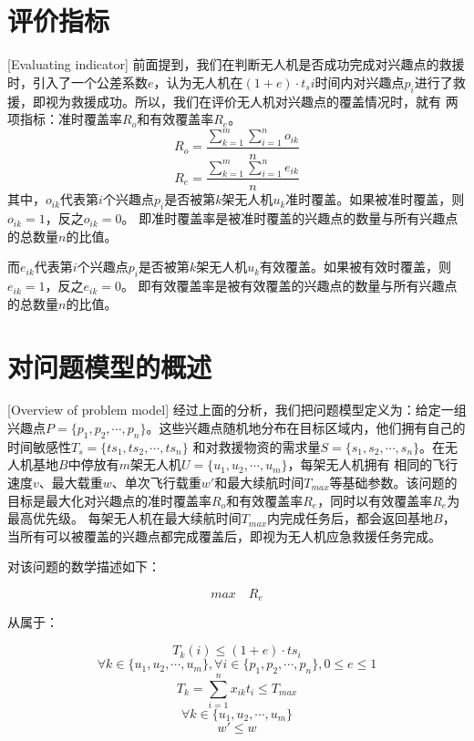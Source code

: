 \section{评价指标}[Evaluating indicator]
前面提到，我们在判断无人机是否成功完成对兴趣点的救援时，引入了一个公差系数$e$，认为无人机在$(1+e) \cdot t_si$时间内对兴趣点$p_i$进行了救援，即视为救援成功。所以，我们在评价无人机对兴趣点的覆盖情况时，就有
两项指标：准时覆盖率$R_o$和有效覆盖率$R_e$。
\begin{equation}
R_o=\frac{\sum_{k=1}^m\sum_{i=1}^n o_{ik}}{n}
\end{equation}
\begin{equation}
R_e=\frac{\sum_{k=1}^m\sum_{i=1}^n e_{ik}}{n}
\end{equation}
其中，$o_{ik}$代表第$i$个兴趣点$p_i$是否被第$k$架无人机$u_k$准时覆盖。如果被准时覆盖，则$o_{ik} = 1$，反之$o_{ik} = 0$。
即准时覆盖率是被准时覆盖的兴趣点的数量与所有兴趣点的总数量$n$的比值。


而$e_{ik}$代表第$i$个兴趣点$p_i$是否被第$k$架无人机$u_k$有效覆盖。如果被有效时覆盖，则$e_{ik} = 1$，反之$e_{ik} = 0$。
即有效覆盖率是被有效覆盖的兴趣点的数量与所有兴趣点的总数量$n$的比值。

\section{对问题模型的概述}[Overview of problem model]
经过上面的分析，我们把问题模型定义为：给定一组兴趣点$P=\lbrace p_1, p_2, \cdots ,p_n \rbrace$。这些兴趣点随机地分布在目标区域内，他们拥有自己的时间敏感性$T_s=\lbrace ts_1, ts_2, \cdots ,ts_n \rbrace$
和对救援物资的需求量$S=\lbrace s_1, s_2, \cdots ,s_n \rbrace$。在无人机基地$B$中停放有$m$架无人机$U=\lbrace u_1, u_2, \cdots ,u_m \rbrace$，每架无人机拥有
相同的飞行速度$v$、最大载重$w$、单次飞行载重$w \prime$和最大续航时间$T_{max}$等基础参数。该问题的目标是最大化对兴趣点的准时覆盖率$R_o$和有效覆盖率$R_e$，同时以有效覆盖率$R_e$为最高优先级。
每架无人机在最大续航时间$T_{max}$内完成任务后，都会返回基地$B$，当所有可以被覆盖的兴趣点都完成覆盖后，即视为无人机应急救援任务完成。


对该问题的数学描述如下：

\begin{equation}
 {max}\quad{R_e} 
\end{equation}


从属于：


\begin{equation}
	T_k(i) \le (1+e) \cdot ts_i
\end{equation}
\begin{equation}
	{\forall} k\in \lbrace u_1, u_2, \cdots ,u_m \rbrace ,{\forall} i \in \lbrace p_1, p_2, \cdots ,p_n \rbrace,0\le e \le1
\end{equation}
\begin{equation}
	T_k = \sum_{i=1}^n x_{ik}t_i \le T_{max}
\end{equation}
\begin{equation}
	{\forall} k\in \lbrace u_1, u_2, \cdots ,u_m \rbrace
\end{equation}
\begin{equation}
	w \prime \le w
\end{equation}

